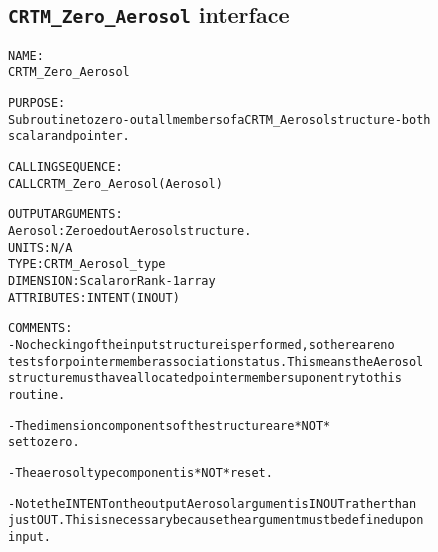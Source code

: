 \subsection{\texttt{CRTM\_Zero\_Aerosol} interface}
  \label{sec:CRTM_Zero_Aerosol_interface}
  \begin{alltt}
 
  NAME:
        CRTM_Zero_Aerosol
  
  PURPOSE:
        Subroutine to zero-out all members of a CRTM_Aerosol structure - both
        scalar and pointer.
 
  CALLING SEQUENCE:
        CALL CRTM_Zero_Aerosol( Aerosol )
 
  OUTPUT ARGUMENTS:
        Aerosol: Zeroed out Aerosol structure.
                 UNITS:      N/A
                 TYPE:       CRTM_Aerosol_type
                 DIMENSION:  Scalar or Rank-1 array
                 ATTRIBUTES: INTENT(IN OUT)
 
  COMMENTS:
        - No checking of the input structure is performed, so there are no
          tests for pointer member association status. This means the Aerosol
          structure must have allocated pointer members upon entry to this
          routine.
 
        - The dimension components of the structure are *NOT*
          set to zero.
 
        - The aerosol type component is *NOT* reset.
 
        - Note the INTENT on the output Aerosol argument is IN OUT rather than
          just OUT. This is necessary because the argument must be defined upon
          input.
 
  \end{alltt}
